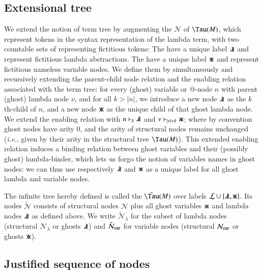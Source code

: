 \documentclass{elsarticle}
\makeatletter
\theoremstyle{plain}
\theoremstyle{definition}
\newcommand\Nodes{\mathcal{N}}%
\newcommand\NodesVar{\Nodes_{\sf var}}%
\newcommand\NodesLmd{\Nodes_\lambda}%
\newcommand{\ghostlmd}{{\lambda\mkern-7mu \lambda}}
\newcommand{\ghostvar}{\mathsf{x\mkern-5mu x}}
\newcommand\ExtendedNodes{\tilde{\Nodes}}
\newcommand\ExtendedNodesVar{\tilde{\Nodes}_{\sf var}}
\newcommand\ExtendedNodesLmd{\tilde{\Nodes}_{\lambda}}
\newcommand{\enables}{\vdash} %
\newcommand{\ctree}{\Tau} %
\newcommand{\exttree}{\tilde{\Tau}} %
\renewcommand\ie{{\it i.e.\@\xspace}}
\makeatother
\begin{document}
\subsection{Extensional tree}
We extend the notion of term tree by augmenting the
  $\Nodes$ of $\ctree(M)$, which represent tokens in the syntax representation of the lambda term,
with two countable sets of  representing fictitious tokens: The   have a
 unique label $\ghostlmd$ and represent fictitious lambda abstractions.
The  have a unique label $\ghostvar$ and represent fictitious nameless variable nodes.
%
We define them by simultaneously and recursively
extending the parent-child node relation and the enabling relation
associated with the term tree: for every (ghost) variable or @-node $n$ with parent (ghost) lambda node $\nu$, and for all $k>|n|$,
we introduce a new node $\ghostlmd$ as the $k$th-child of $n$,
and a new node $\ghostvar$ as the unique child of that ghost lambda node.
We extend the enabling relation with $n \enables_k \ghostlmd$
and $\nu \enables_{|\nu|+ k} \ghostvar$; where by convention ghost nodes have arity $0$, and the arity of structural nodes remains unchanged (\ie, given by their arity in the structural tree $\ctree(M)$).
%
This extended enabling relation induces a binding relation between ghost variables and their (possibly ghost) lambda-binder, which lets us forgo the notion of variables names in ghost nodes: we can thus
use respectively $\ghostlmd$ and $\ghostvar$ as a unique label for all ghost lambda and variable nodes.

The infinite tree hereby defined is called the  $\exttree(M)$ over labels $\mathcal{L} \union \{ \ghostlmd, \ghostvar \}$.
Its nodes $\ExtendedNodes$ consists of structural nodes $\Nodes$ plus all ghost variables $\ghostvar$ and lambda nodes $\ghostlmd$ as defined above.
We write $\ExtendedNodesLmd$ for the subset of lambda nodes (structural $\NodesLmd$ or ghosts $\ghostlmd$) and $\ExtendedNodesVar$ for variable nodes (structural $\NodesVar$ or ghosts $\ghostvar$).

\subsection{Justified sequence of nodes}
\label{sec:justseq}
\end{document}
